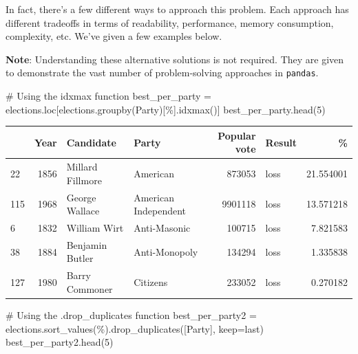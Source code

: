 \documentclass[
  letterpaper,
  DIV=11,
  numbers=noendperiod]{scrreprt}
\newenvironment{Shaded}{\begin{snugshade}}{\end{snugshade}}
\newcommand{\CommentTok}[1]{\textcolor[rgb]{0.37,0.37,0.37}{#1}}
\newcommand{\DecValTok}[1]{\textcolor[rgb]{0.68,0.00,0.00}{#1}}
\newcommand{\NormalTok}[1]{\textcolor[rgb]{0.00,0.23,0.31}{#1}}
\newcommand{\OperatorTok}[1]{\textcolor[rgb]{0.37,0.37,0.37}{#1}}
\newcommand{\StringTok}[1]{\textcolor[rgb]{0.13,0.47,0.30}{#1}}
\begin{document}
In fact, there's a few different ways to approach this problem. Each
approach has different tradeoffs in terms of readability, performance,
memory consumption, complexity, etc. We've given a few examples below.

\textbf{Note}: Understanding these alternative solutions is not
required. They are given to demonstrate the vast number of
problem-solving approaches in \texttt{pandas}.

\begin{Shaded}
\begin{Highlighting}[]
\CommentTok{\# Using the idxmax function}
\NormalTok{best\_per\_party }\OperatorTok{=}\NormalTok{ elections.loc[elections.groupby(}\StringTok{\textquotesingle{}Party\textquotesingle{}}\NormalTok{)[}\StringTok{\textquotesingle{}\%\textquotesingle{}}\NormalTok{].idxmax()]}
\NormalTok{best\_per\_party.head(}\DecValTok{5}\NormalTok{)}
\end{Highlighting}
\end{Shaded}

\begin{tabular}{lrllrlr}
\toprule
{} &  Year &         Candidate &                 Party &  Popular vote & Result &          \% \\
\midrule
22  &  1856 &  Millard Fillmore &              American &        873053 &   loss &  21.554001 \\
115 &  1968 &    George Wallace &  American Independent &       9901118 &   loss &  13.571218 \\
6   &  1832 &      William Wirt &          Anti-Masonic &        100715 &   loss &   7.821583 \\
38  &  1884 &   Benjamin Butler &         Anti-Monopoly &        134294 &   loss &   1.335838 \\
127 &  1980 &    Barry Commoner &              Citizens &        233052 &   loss &   0.270182 \\
\bottomrule
\end{tabular}

\begin{Shaded}
\begin{Highlighting}[]
\CommentTok{\# Using the .drop\_duplicates function}
\NormalTok{best\_per\_party2 }\OperatorTok{=}\NormalTok{ elections.sort\_values(}\StringTok{\textquotesingle{}\%\textquotesingle{}}\NormalTok{).drop\_duplicates([}\StringTok{\textquotesingle{}Party\textquotesingle{}}\NormalTok{], keep}\OperatorTok{=}\StringTok{\textquotesingle{}last\textquotesingle{}}\NormalTok{)}
\NormalTok{best\_per\_party2.head(}\DecValTok{5}\NormalTok{)}
\end{Highlighting}
\end{Shaded}
\end{document}

